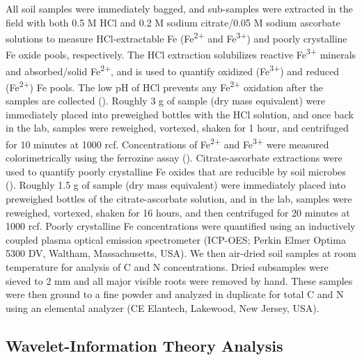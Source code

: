 \documentclass[
  12pt,
]{article}
\begin{document}
All soil samples were immediately bagged, and sub-samples were extracted
in the field with both 0.5 M HCl and 0.2 M sodium citrate/0.05 M sodium
ascorbate solutions to measure HCl-extractable Fe
(Fe\textsuperscript{2+} and Fe\textsuperscript{3+}) and poorly
crystalline Fe oxide pools, respectively. The HCl extraction solubilizes
reactive Fe\textsuperscript{3+} minerals and absorbed/solid
Fe\textsuperscript{2+}, and is used to quantify oxidized
(Fe\textsuperscript{3+}) and reduced (Fe\textsuperscript{2+}) Fe pools.
The low pH of HCl prevents any Fe\textsuperscript{2+} oxidation after
the samples are collected (). Roughly 3 g of sample (dry mass equivalent) were
immediately placed into preweighed bottles with the HCl solution, and
once back in the lab, samples were reweighed, vortexed, shaken for 1
hour, and centrifuged for 10 minutes at 1000 rcf. Concentrations of
Fe\textsuperscript{2+} and Fe\textsuperscript{3+} were measured
colorimetrically using the ferrozine assay
().
Citrate-ascorbate extractions were used to quantify poorly crystalline
Fe oxides that are reducible by soil microbes
().
Roughly 1.5 g of sample (dry mass equivalent) were immediately placed
into preweighed bottles of the citrate-ascorbate solution, and in the
lab, samples were reweighed, vortexed, shaken for 16 hours, and then
centrifuged for 20 minutes at 1000 rcf. Poorly crystalline Fe
concentrations were quantified using an inductively coupled plasma
optical emission spectrometer (ICP-OES; Perkin Elmer Optima 5300 DV,
Waltham, Massachusetts, USA). We then air-dried soil samples at room
temperature for analysis of C and N concentrations. Dried subsamples
were sieved to 2 mm and all major visible roots were removed by hand.
These samples were then ground to a fine powder and analyzed in
duplicate for total C and N using an elemental analyzer (CE Elantech,
Lakewood, New Jersey, USA).

\subsection{Wavelet-Information Theory
Analysis}\label{wavelet-information-theory-analysis}
\end{document}
